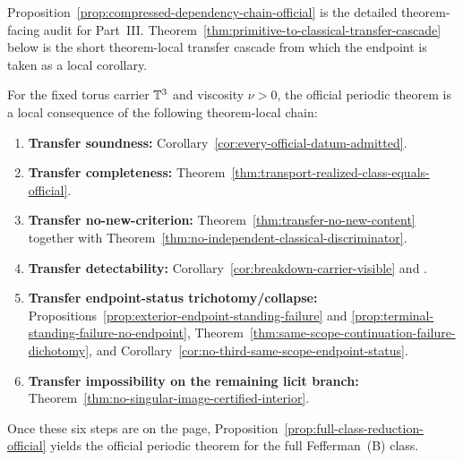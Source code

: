 \begin{remark}\label{rem:detail-vs-short-spine}
Proposition~\ref{prop:compressed-dependency-chain-official} is the detailed theorem-facing audit for
Part~III. Theorem~\ref{thm:primitive-to-classical-transfer-cascade} below is the short theorem-local transfer cascade from which the endpoint is taken as a local corollary.
\end{remark}

\begin{theorem}\label{thm:primitive-to-classical-transfer-cascade}
For the fixed torus carrier $\mathbb{T}^3$ and viscosity $\nu>0$, the official periodic theorem is a local consequence of the following theorem-local chain:
\begin{enumerate}[label=(\roman*), leftmargin=2.2em]
\item \textbf{Transfer soundness:} Corollary~\ref{cor:every-official-datum-admitted}.
\item \textbf{Transfer completeness:} Theorem~\ref{thm:transport-realized-class-equals-official}.
\item \textbf{Transfer no-new-criterion:} Theorem~\ref{thm:transfer-no-new-content} together with Theorem~\ref{thm:no-independent-classical-discriminator}.
\item \textbf{Transfer detectability:} Corollary~\ref{cor:breakdown-carrier-visible} and \HorizonDetectabilityRef{}.
\item \textbf{Transfer endpoint-status trichotomy/collapse:} Propositions~\ref{prop:exterior-endpoint-standing-failure} and \ref{prop:terminal-standing-failure-no-endpoint}, Theorem~\ref{thm:same-scope-continuation-failure-dichotomy}, and Corollary~\ref{cor:no-third-same-scope-endpoint-status}.
\item \textbf{Transfer impossibility on the remaining licit branch:} Theorem~\ref{thm:no-singular-image-certified-interior}.
\end{enumerate}
Once these six steps are on the page, Proposition~\ref{prop:full-class-reduction-official} yields the official periodic theorem for the full Fefferman~(B) class.
\end{theorem}

